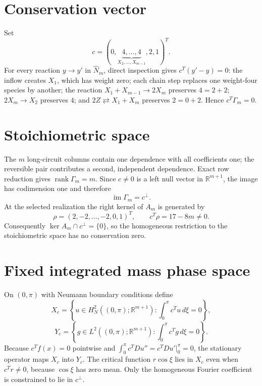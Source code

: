 \section*{Conservation vector}
Set
\[
c=(0,\underbrace{4,\ldots,4}_{X_2,\ldots,X_{m-1}},2,1)^T.
\]
For every reaction $y\to y'$ in $\widehat N_m$, direct inspection gives
$c^T(y'-y)=0$: the inflow creates $X_1$, which has weight zero; each chain
step replaces one weight-four species by another; the reaction
$X_1+X_{m-1}\to2X_m$ preserves $4=2+2$; $2X_m\to X_2$ preserves $4$; and
$2Z\rightleftarrows X_1+X_m$ preserves $2=0+2$.  Hence $c^T\Gamma_m=0$.


\section*{Stoichiometric space}
The $m$ long-circuit columns contain one dependence with all coefficients one;
the reversible pair contributes a second, independent dependence.  Exact row
reduction gives $\operatorname{rank}\Gamma_m=m$.  Since $c\neq0$ is a left
null vector in $\mathbb R^{m+1}$, the image has codimension one and therefore
\[
\operatorname{im}\Gamma_m=c^\perp.
\]
At the selected realization the right kernel of $A_m$ is generated by
\[
\rho=(2,-2,\ldots,-2,0,1)^T,
\qquad c^T\rho=17-8m\neq0.
\]
Consequently $\ker A_m\cap c^\perp=\{0\}$, so the homogeneous restriction to
the stoichiometric space has no conservation zero.


\section*{Fixed integrated mass phase space}
On $(0,\pi)$ with Neumann boundary conditions define
\[
X_c=\left\{u\in H_N^2((0,\pi);\mathbb R^{m+1}):
\int_0^\pi c^Tu\,d\xi=0\right\},
\]
\[
Y_c=\left\{g\in L^2((0,\pi);\mathbb R^{m+1}):
\int_0^\pi c^Tg\,d\xi=0\right\}.
\]
Because $c^Tf(x)=0$ pointwise and
$\int_0^\pi c^TDu''=c^TDu'|_0^\pi=0$, the stationary operator maps
$X_c$ into $Y_c$.  The critical function $r\cos\xi$ lies in $X_c$ even when
$c^Tr\neq0$, because $\cos\xi$ has zero mean.  Only the homogeneous Fourier
coefficient is constrained to lie in $c^\perp$.
